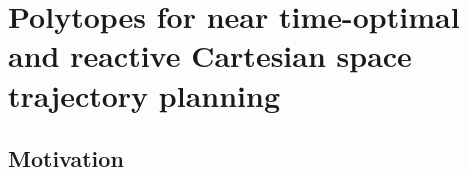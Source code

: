
\chapter{Polytopes for near time-optimal and reactive Cartesian space trajectory planning}
\label{ch:topca}

\newcommand{\DD}[1]{\textcolor{teal}{[dd] #1}}
\newcommand{\redo}[1]{\todo[inline]{[redo] #1}}



\section{Motivation}

